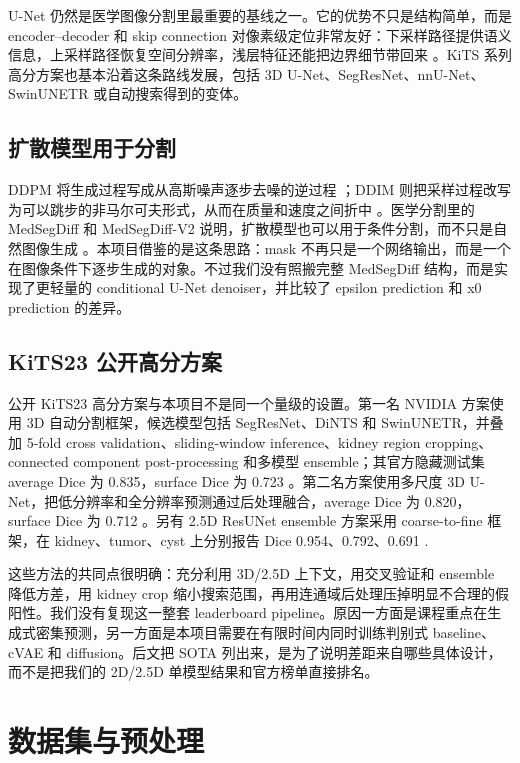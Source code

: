 \documentclass[lang=cn,11pt,a4paper]{elegantpaper}
\begin{document}
U-Net 仍然是医学图像分割里最重要的基线之一。它的优势不只是结构简单，而是 encoder--decoder 和 skip connection 对像素级定位非常友好：下采样路径提供语义信息，上采样路径恢复空间分辨率，浅层特征还能把边界细节带回来 \cite{ronneberger2015unet}。KiTS 系列高分方案也基本沿着这条路线发展，包括 3D U-Net、SegResNet、nnU-Net、SwinUNETR 或自动搜索得到的变体。

\subsection{扩散模型用于分割}

DDPM 将生成过程写成从高斯噪声逐步去噪的逆过程 \cite{ho2020ddpm}；DDIM 则把采样过程改写为可以跳步的非马尔可夫形式，从而在质量和速度之间折中 \cite{song2020ddim}。医学分割里的 MedSegDiff 和 MedSegDiff-V2 说明，扩散模型也可以用于条件分割，而不只是自然图像生成 \cite{wu2022medsegdiff,wu2023medsegdiffv2}。本项目借鉴的是这条思路：mask 不再只是一个网络输出，而是一个在图像条件下逐步生成的对象。不过我们没有照搬完整 MedSegDiff 结构，而是实现了更轻量的 conditional U-Net denoiser，并比较了 epsilon prediction 和 x0 prediction 的差异。

\subsection{KiTS23 公开高分方案}

公开 KiTS23 高分方案与本项目不是同一个量级的设置。第一名 NVIDIA 方案使用 3D 自动分割框架，候选模型包括 SegResNet、DiNTS 和 SwinUNETR，并叠加 5-fold cross validation、sliding-window inference、kidney region cropping、connected component post-processing 和多模型 ensemble；其官方隐藏测试集 average Dice 为 0.835，surface Dice 为 0.723 \cite{myronenko2023kits23}。第二名方案使用多尺度 3D U-Net，把低分辨率和全分辨率预测通过后处理融合，average Dice 为 0.820，surface Dice 为 0.712 \cite{uhm2023kits23}。另有 2.5D ResUNet ensemble 方案采用 coarse-to-fine 框架，在 kidney、tumor、cyst 上分别报告 Dice 0.954、0.792、0.691 \cite{chen2023kits23}.

这些方法的共同点很明确：充分利用 3D/2.5D 上下文，用交叉验证和 ensemble 降低方差，用 kidney crop 缩小搜索范围，再用连通域后处理压掉明显不合理的假阳性。我们没有复现这一整套 leaderboard pipeline。原因一方面是课程重点在生成式密集预测，另一方面是本项目需要在有限时间内同时训练判别式 baseline、cVAE 和 diffusion。后文把 SOTA 列出来，是为了说明差距来自哪些具体设计，而不是把我们的 2D/2.5D 单模型结果和官方榜单直接排名。

\section{数据集与预处理}
\end{document}
